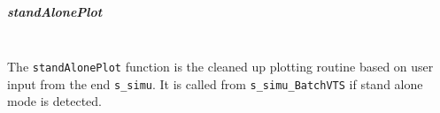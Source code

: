 \documentclass[12pt]{article}
\begin{document}
\subparagraph{standAlonePlot} \ \\
The \verb|standAlonePlot| function is the cleaned up plotting routine based on user input from the end \verb|s_simu|.
It is called from \verb|s_simu_BatchVTS| if stand alone mode is detected.

\end{document}
